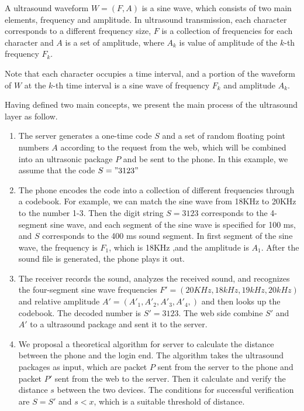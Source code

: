 \begin{definition}\label{def:ultrasound waveform}
A ultrasound waveform $W=(F,A)$ is a sine wave, which consists of two main elements, frequency and amplitude. In ultrasound transmission, each character corresponds to a different frequency size, $F$ is a collection of frequencies for each character and $A$ is a set of amplitude, where $A_k$ is value of amplitude of the $k$-th frequency $F_k$.

\end{definition}
Note that each character occupies a time interval, and a portion of the waveform of $W$ at the $k$-th time interval is a sine wave of frequency $F_k$ and amplitude $A_k$. 

\vspace{6pt}

Having defined two main concepts, we present the main process of the ultrasound layer as follow.

\begin{enumerate}

\item The server generates a one-time code $S$ and a set of random floating point numbers $A$ according to the request from the web, which will be combined  into an ultrasonic package $P$ and be sent to the phone. In this example, we assume that the code $S="3123"$

\item The phone encodes the code into a collection of different frequencies through a codebook. For example, we can match the sine wave from 18KHz to 20KHz to the number 1-3. Then the digit string $S=3123$ corresponds to the 4-segment sine wave, and each segment of the sine wave is specified for 100 ms, and $S$ corresponds to the 400 ms sound segment. In first segment of the sine wave, the frequency is $F_1$, which is 18KHz ,and the amplitude is $A_1$. After the sound file is generated, the phone plays it out.

\item The receiver records the sound, analyzes the received sound, and recognizes the four-segment sine wave frequencies $F'=(20KHz, 18kHz, 19kHz, 20kHz)$ and relative amplitude $A'=(A'_1,A'_2,A'_3,A'_4,)$ and then looks up the codebook. The decoded number is $S'=3123$.
The web side combine $S'$ and $A'$ to a ultrasound package and sent it to the server.

\item We proposal a theoretical algorithm for server to calculate the distance between the phone and the login end. The algorithm takes the ultrasound packages as input, which are packet $P$ sent from the server to the phone and packet $P'$ sent from the web to the server. Then it calculate and verify the distance $s$ between the two devices. The conditions for successful verification are $S=S'$ and $s<x$, which is a suitable threshold of distance.
\end{enumerate}

